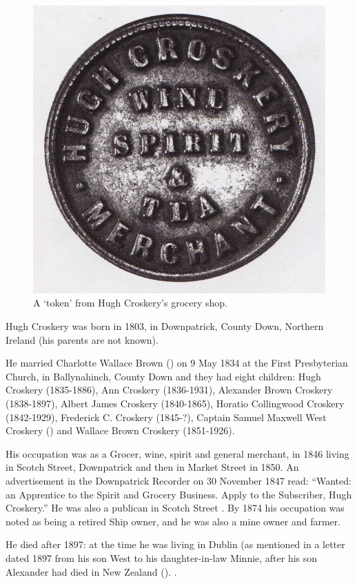 
\begin{figure}
 \centering
 \includegraphics{photos/Hugh_Croskery_token}
 \caption{A `token' from Hugh Croskery's grocery shop.\cite{DownTown2}}
\end{figure}

Hugh Croskery was born in 1803, in Downpatrick, County Down, Northern Ireland (his parents are not known).

He married Charlotte Wallace Brown () on 9 May 1834 at the First Presbyterian Church, in Ballynahinch, County Down and they had eight children:  Hugh Croskery (1835-1886), Ann Croskery (1836-1931), Alexander Brown Croskery (1838-1897), Albert James Croskery (1840-1865), Horatio Collingwood Croskery (1842-1929), Frederick C. Croskery (1845-?),  Captain Samuel Maxwell West Croskery () and Wallace Brown Croskery (1851-1926). 

His occupation was as a Grocer, wine, spirit and general merchant, in 1846 living in Scotch Street, Downpatrick and then in Market Street in 1850. An advertisement in the Downpatrick Recorder on 30 November 1847 read:
``Wanted: an Apprentice to the Spirit and Grocery Business. Apply to the Subscriber, Hugh Croskery.''\cite{HCroskeryAdvert}  He was also a publican in Scotch Street \cite{HughCroskeryOccupation}. By 1874 his occupation was noted as being a retired Ship owner, and he was also a mine owner and farmer. 

He died after 1897: at the time he was living in Dublin (as mentioned in a letter dated 1897 from his son West to his daughter-in-law Minnie, after his son Alexander had died in New Zealand (). \cite{HughCroskeryDeath}.

